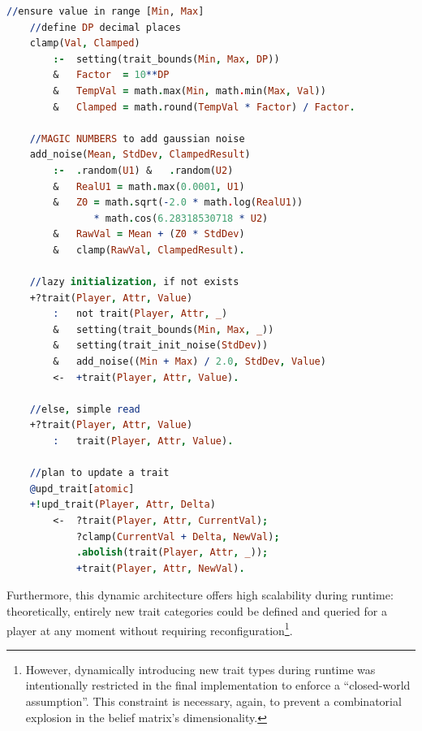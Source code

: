 \begin{lstlisting}[frame=single, language=Prolog, caption={Implementation of trait management defined in \texttt{players/first\_order\_beliefs/traits.asl}. The code features lazy initialization of undefined traits using Gaussian noise to introduce stochasticity, alongside an atomic update plan that seamlessly queries (initializing if necessary) and modifies the belief by a given delta.}, label={lst:trait_management}]
    //ensure value in range [Min, Max]
    //define DP decimal places
    clamp(Val, Clamped)
        :-  setting(trait_bounds(Min, Max, DP))
        &   Factor  = 10**DP
        &   TempVal = math.max(Min, math.min(Max, Val))
        &   Clamped = math.round(TempVal * Factor) / Factor.
    
    //MAGIC NUMBERS to add gaussian noise
    add_noise(Mean, StdDev, ClampedResult)
        :-  .random(U1) &   .random(U2)
        &   RealU1 = math.max(0.0001, U1)
        &   Z0 = math.sqrt(-2.0 * math.log(RealU1)) 
               * math.cos(6.28318530718 * U2)
        &   RawVal = Mean + (Z0 * StdDev)
        &   clamp(RawVal, ClampedResult).
    
    //lazy initialization, if not exists
    +?trait(Player, Attr, Value) 
        :   not trait(Player, Attr, _)
        &   setting(trait_bounds(Min, Max, _))
        &   setting(trait_init_noise(StdDev))
        &   add_noise((Min + Max) / 2.0, StdDev, Value)
        <-  +trait(Player, Attr, Value).
    
    //else, simple read
    +?trait(Player, Attr, Value) 
        :   trait(Player, Attr, Value).

    //plan to update a trait
    @upd_trait[atomic]
    +!upd_trait(Player, Attr, Delta)
        <-  ?trait(Player, Attr, CurrentVal);
            ?clamp(CurrentVal + Delta, NewVal);
            .abolish(trait(Player, Attr, _));
            +trait(Player, Attr, NewVal).    
\end{lstlisting}

Furthermore, this dynamic architecture offers high scalability during runtime: theoretically, entirely new trait categories could be defined and queried for a player at any moment without requiring reconfiguration\footnote{However, dynamically introducing new trait types during runtime was intentionally restricted in the final implementation to enforce a ``closed-world assumption''. This constraint is necessary, again, to prevent a combinatorial explosion in the belief matrix's dimensionality.}.



